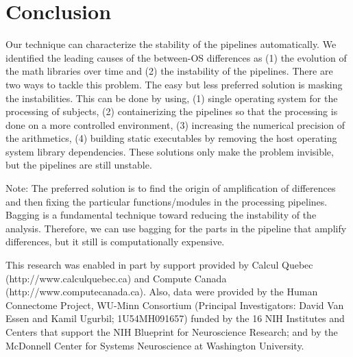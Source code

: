 \documentclass[a4paper,num-refs]{oup-contemporary}
\newcommand{\note}[2]{\color{blue}Note: #1\color{black}}
\begin{document}

\section{Conclusion}

Our technique can characterize the stability of the pipelines
automatically. We identified the leading causes of the between-OS differences as (1) the evolution 
of the math libraries over time and (2) the instability of the pipelines. 
There are two ways to tackle this problem. The easy but less preferred solution is masking the instabilities.
This can be done by using, (1) single operating system for the processing of subjects, 
(2) containerizing the pipelines so that the 
processing is done on a more controlled environment, 
(3) increasing the numerical precision of the arithmetics, 
(4) building static executables by removing the host operating system library dependencies. 
These solutions only make the problem invisible, but the pipelines are still unstable.

\note{The preferred solution is to find the origin of amplification of differences and 
then fixing the particular functions/modules in the processing pipelines. 
Bagging is a fundamental technique toward reducing the instability of the analysis.
Therefore, we can use bagging for the parts in the pipeline that amplify differences, 
but it still is computationally expensive. }




\section{Acknowledgments}

This research was enabled in part by support provided by 
Calcul Quebec (http://www.calculquebec.ca) and 
Compute Canada (http://www.computecanada.ca).
Also, data were provided by the Human Connectome Project, WU-Minn 
Consortium (Principal Investigators: David Van Essen and Kamil Ugurbil; 
1U54MH091657) funded by the 16 NIH Institutes and Centers that support 
the NIH Blueprint for Neuroscience Research; and by the McDonnell 
Center for Systems Neuroscience at Washington University.








\end{document}
